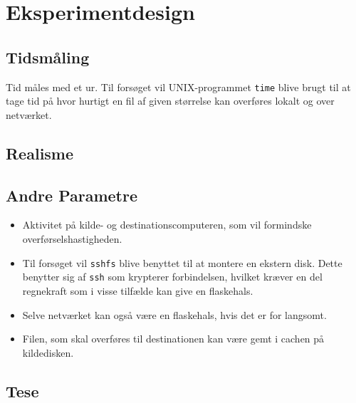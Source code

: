 \documentclass{article}
\author{Mikkel, Jannik, Rune \& Rasmus}
\date{\today}
\begin{document}
\section{Eksperimentdesign}

\subsection{Tidsmåling}
Tid måles med et ur. Til forsøget vil UNIX-programmet {\tt time} blive brugt til at tage tid på hvor hurtigt en fil af given størrelse kan overføres lokalt og over netværket.
\subsection{Realisme}


\subsection{Andre Parametre}

\begin{itemize}
	\item Aktivitet på kilde- og destinationscomputeren, som vil formindske overførselshastigheden.
	\item Til forsøget vil {\tt sshfs} blive benyttet til at montere en ekstern disk. Dette benytter sig af {\tt ssh} som krypterer forbindelsen, hvilket kræver en del regnekraft som i visse tilfælde kan give en flaskehals.
	\item Selve netværket kan også være en flaskehals, hvis det er for langsomt.
	\item Filen, som skal overføres til destinationen kan være gemt i cachen på kildedisken.
\end{itemize}

\subsection{Tese}

\end{document}
